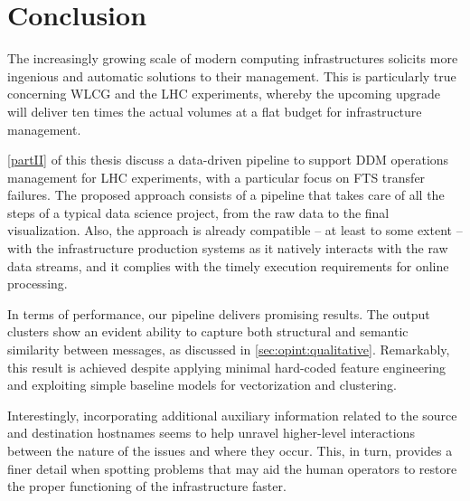 \chapter{Conclusion} \label{ch:opint:conclusion}

The increasingly growing scale of modern computing infrastructures solicits more ingenious and automatic solutions to their management.
This is particularly true concerning WLCG and the LHC experiments, whereby the upcoming upgrade will deliver ten times the actual volumes at a flat budget for infrastructure management.

\cref{partII} of this thesis discuss a data-driven pipeline to support DDM operations management for LHC experiments, with a particular focus on FTS transfer failures.
The proposed approach consists of a pipeline that takes care of all the steps of a typical data science project, from the raw data to the final visualization.
Also, the approach is already compatible -- at least to some extent -- with the infrastructure production systems as it natively interacts with the raw data streams, and it complies with the timely execution requirements for online processing.

In terms of performance, our pipeline delivers promising results. 
The output clusters show an evident ability to capture both structural and semantic similarity between messages, as discussed in \cref{sec:opint:qualitative}.
Remarkably, this result is achieved despite applying minimal hard-coded feature engineering and exploiting simple baseline models for vectorization and clustering. 


Interestingly, incorporating additional auxiliary information related to the source and destination hostnames seems to help unravel higher-level interactions between the nature of the issues and where they occur.
This, in turn, provides a finer detail when spotting problems that may aid the human operators to restore the proper functioning of the infrastructure faster.


